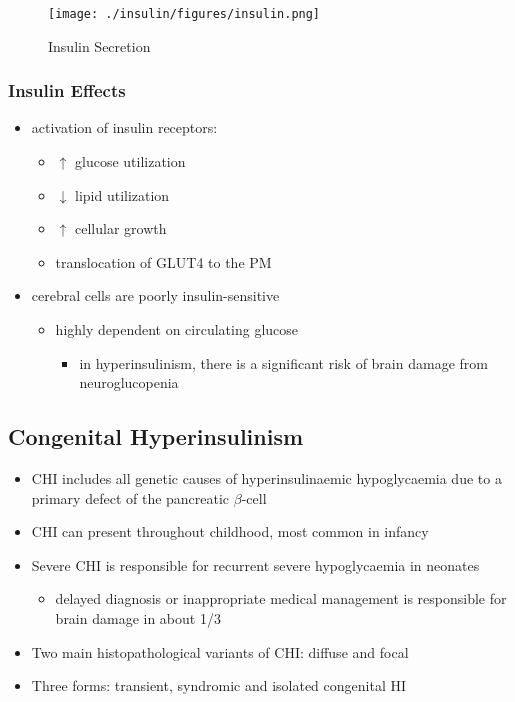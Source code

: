 \documentclass{scrartcl}
\begin{document}
\begin{figure}[htbp]
\centering
\texttt{[image: ./insulin/figures/insulin.png]}
\caption[insulin]{\label{fig:org65c1378}
Insulin Secretion}
\end{figure}

\subsubsection{Insulin Effects}
\label{sec:orga9c35b3}
\begin{itemize}
\item activation of insulin receptors:
\begin{itemize}
\item \(\uparrow\) glucose utilization
\item \(\downarrow\) lipid utilization
\item \(\uparrow\) cellular growth
\item translocation of GLUT4 to the PM
\end{itemize}
\item cerebral cells are poorly insulin-sensitive
\begin{itemize}
\item highly dependent on circulating glucose
\begin{itemize}
\item in hyperinsulinism, there is a significant risk of brain damage
from neuroglucopenia
\end{itemize}
\end{itemize}
\end{itemize}

\subsection{Congenital Hyperinsulinism}
\label{sec:org017c11f}
\begin{itemize}
\item CHI includes all genetic causes of hyperinsulinaemic
hypoglycaemia due to a primary defect of the pancreatic
\(\beta\)-cell
\item CHI can present throughout childhood, most common in infancy
\item Severe CHI is responsible for recurrent severe hypoglycaemia in neonates
\begin{itemize}
\item delayed diagnosis or inappropriate medical management is responsible for brain damage in about 1/3
\end{itemize}
\item Two main histopathological variants of CHI: diffuse and focal
\item Three forms: transient, syndromic and isolated congenital HI
\end{itemize}
\end{document}
